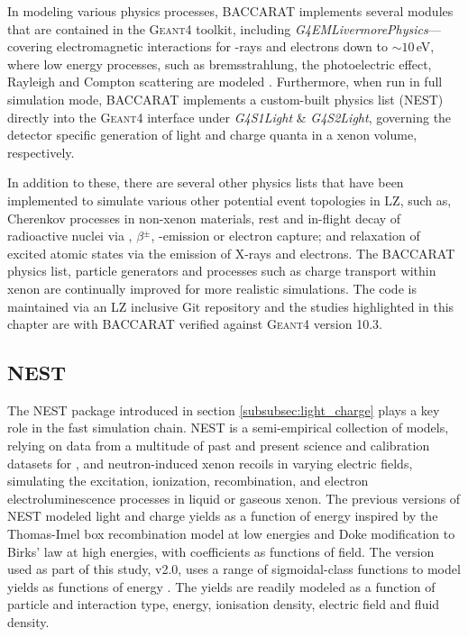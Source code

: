In modeling various physics processes, \textsc{BACCARAT} implements several modules that are contained in the \textsc{Geant4} toolkit, including \textit{G4EMLivermorePhysics}---covering electromagnetic interactions for \gamma{}-rays and electrons down to $\sim10$\,eV, where low energy processes, such as bremsstrahlung, the photoelectric effect, Rayleigh and Compton scattering are modeled \cite{osti_295438, osti_5691165}. Furthermore, when run in full simulation mode, \textsc{BACCARAT} implements a custom-built physics list (NEST) directly into the \textsc{Geant4} interface under \textit{G4S1Light} \& \textit{G4S2Light}, governing the detector specific generation of light and charge quanta in a xenon volume, respectively.

In addition to these, there are several other physics lists that have been implemented to simulate various other potential event topologies in LZ, such as, Cherenkov processes in non-xenon materials, rest and in-flight decay of radioactive nuclei via \alpha, $\beta{}^{\pm}$, \gamma-emission or electron capture; and relaxation of excited atomic states via the emission of X-rays and electrons. The \textsc{BACCARAT} physics list, particle generators and processes such as charge transport within xenon are continually improved for more realistic simulations. The code is maintained via an LZ inclusive Git repository and the studies highlighted in this chapter are with BACCARAT verified against \textsc{Geant4} version 10.3.


\subsection{NEST}
\label{secsec:NEST}

The NEST package introduced in section \ref{subsubsec:light_charge} plays a key role in the fast simulation chain. NEST is a semi-empirical collection of models, relying on data from a multitude of past and present science and calibration datasets for \beta, \gamma and neutron-induced xenon recoils in varying electric fields, simulating the excitation, ionization, recombination, and electron electroluminescence processes in liquid or gaseous xenon. The previous versions of NEST \cite{Szydagis_2011, Mock_2014} modeled light and charge yields as a function of energy inspired by the Thomas-Imel box recombination model at low energies \cite{PhysRevA.36.614} and Doke modification to Birks’ law \cite{DOKE1988291} at high energies, with coefficients as functions of field. The version used as part of this study, v2.0, uses a range of sigmoidal-class functions to model yields as functions of energy \cite{nest_v2}. The yields are readily modeled as a function of particle and interaction type, energy, ionisation density, electric field and fluid density.

